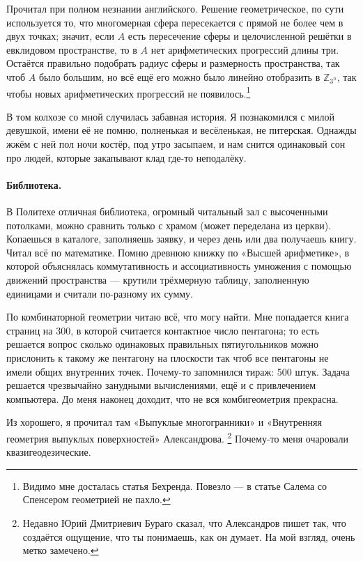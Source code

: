 \documentclass{book}
\begin{document}
Прочитал при полном незнании английского.
Решение геометрическое, по сути используется то, 
что многомерная сфера пересекается с прямой не более чем в двух точках;
значит, если $A$ есть пересечение сферы и целочисленной решётки в евклидовом пространстве,
то в $A$ нет арифметических прогрессий длины три.
Остаётся правильно подобрать радиус сферы и размерность пространства,
так чтоб $A$ было большим,
но всё ещё его можно было 
линейно отобразить в $\mathbb{Z}_{3^n}$, так чтобы новых арифметических прогрессий не появилось.\footnote{Видимо мне досталась статья Бехренда.
Повезло --- в статье Салема со Спенсером геометрией не пахло.}

В том колхозе со мной случилась забавная история. 
Я познакомился с милой девушкой, имени её не помню, полненькая и весёленькая, не питерская.
Однажды жжём с ней пол ночи костёр, 
под утро засыпаем, и нам снится одинаковый сон
про людей, которые закапывают клад где-то неподалёку.

\paragraph{Библиотека.}
В Политехе отличная библиотека, огромный читальный зал с высоченными потолками,
можно сравнить только с храмом (может переделана из церкви).
Копаешься в каталоге, заполняешь заявку, и через день или два получаешь книгу.
Читал всё по математике.
Помню древнюю книжку по «Высшей арифметике»,
в которой объяснялась коммутативность и ассоциативность умножения с помощью движений пространства --- крутили трёхмерную таблицу, заполненную единицами и считали по-разному их сумму.

По комбинаторной геометрии читаю всё, что могу найти.
Мне попадается книга страниц на 300,
в которой считается контактное число пентагона;
то есть решается вопрос сколько одинаковых правильных пятиугольников можно прислонить к такому же пентагону на плоскости так чтоб все пентагоны не имели общих внутренних точек.
Почему-то запомнился тираж: 500 штук.
Задача решается чрезвычайно занудными вычислениями, 
ещё и с привлечением компьютера.
До меня наконец доходит, что не вся комбигеометрия прекрасна.

Из хорошего, я прочитал там «Выпуклые многогранники» и «Внутренняя геометрия выпуклых поверхностей» Александрова.%
\footnote{Недавно Юрий Дмитриевич Бураго сказал, что Александров пишет так, что создаётся ощущение, что ты понимаешь, как он думает.
На мой взгляд, очень метко замечено.} 
Почему-то меня очаровали квазигеодезические.
\end{document}
